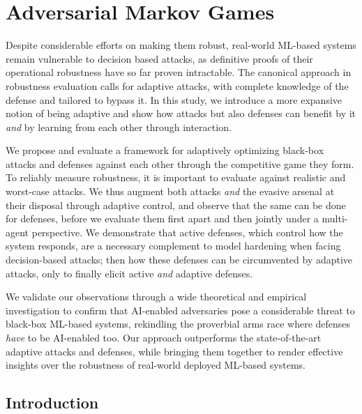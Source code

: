 \chapter{Adversarial Markov Games}\label{ch:markovgames}

Despite considerable efforts on making them robust, real-world ML-based systems remain vulnerable to decision based attacks, as definitive proofs of their operational robustness have so far proven intractable. The canonical approach in robustness evaluation calls for adaptive attacks, with complete knowledge of the defense and tailored to bypass it. In this study, we introduce a more expansive notion of being adaptive and show how attacks but also defenses can benefit by it \emph{and} by learning from each other through interaction.

We propose and evaluate a framework for adaptively optimizing black-box attacks and defenses against each other through the competitive game they form. To reliably measure robustness, it is important to evaluate against realistic and worst-case attacks. We thus augment both attacks \emph{and} the evasive arsenal at their disposal through adaptive control, and observe that the same can be done for defenses, before we evaluate them first apart and then jointly under a multi-agent perspective. We demonstrate that active defenses, which control how the system responds, are a necessary complement to model hardening when facing decision-based attacks; then how these defenses can be circumvented by adaptive attacks, only to finally elicit active \emph{and} adaptive defenses.

We validate our observations through a wide theoretical and empirical investigation to confirm that AI-enabled adversaries pose a considerable threat to black-box ML-based systems, rekindling the proverbial arms race where defenses \emph{have} to be AI-enabled too. Our approach outperforms the state-of-the-art adaptive attacks and defenses, while bringing them together to render effective insights over the robustness of real-world deployed ML-based systems.

\section{Introduction}

